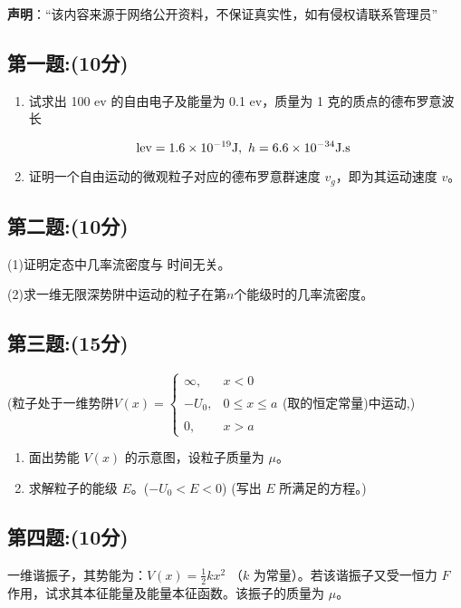 
\textbf{声明}：“该内容来源于网络公开资料，不保证真实性，如有侵权请联系管理员”

\subsection{第一题:(10分)}
\begin{enumerate}
  \item 试求出 100 ev 的自由电子及能量为 0.1 ev，质量为 1 克的质点的德布罗意波长

  \[  \text{lev} = 1.6 \times 10^{-19} \\ \text{J}, \ h = 6.6 \times 10^{-34} \\ \text{J.s}~\]

  \item 证明一个自由运动的微观粒子对应的德布罗意群速度 $v_g$，即为其运动速度 $v$。
\end{enumerate}
\subsection{第二题:(10分)}
(1)证明定态中几率流密度与 时间无关。

(2)求一维无限深势阱中运动的粒子在第$n$个能级时的几率流密度。
\subsection{第三题:(15分)}
(粒子处于一维势阱$V(x) = \begin{cases}    \infty, & x < 0 \\\\    -U_0, & 0 \leq x \leq a \\\\    0, & x > a  \end{cases}$(取的恒定常量)中运动,)

\begin{enumerate}
  \item 面出势能 $V(x)$ 的示意图，设粒子质量为 $\mu$。
  \item 求解粒子的能级 $E$。($-U_0 < E < 0$) (写出 $E$ 所满足的方程。)
\end{enumerate}
\subsection{第四题:(10分)}
一维谐振子，其势能为：$V(x) = \frac{1}{2} k x^2$
（$k$ 为常量）。若该谐振子又受一恒力 $F$ 作用，试求其本征能量及能量本征函数。该振子的质量为 $\mu$。
